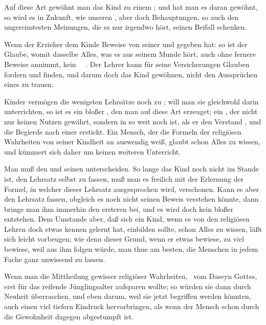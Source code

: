  Auf diese Art gewöhnt man das Kind zu einem ; und hat man es daran gewöhnt, so wird es in Zukunft, wie unseren , aber doch  Behauptungen, so auch den ungereimtesten Meinungen, die es nur irgendwo hört, seinen Beifall schenken.\par
{} Wenn der Erzieher dem Kinde Beweise von seiner  und  gegeben hat: so ist der Glaube, womit dasselbe Alles, was es aus seinem Munde hört, auch ohne fernere Beweise annimmt, kein ~\ . Der Lehrer kann für seine Versicherungen Glauben fordern und finden, und darum doch das Kind gewöhnen, nicht den Aussprüchen eines  zu trauen.\par
{} Kinder vermögen die wenigsten Lehrsätze noch zu ; will man sie gleichwohl darin unterrichten, so ist es ein bloßer , den man auf diese Art erzeuget; ein , der nicht nur keinen Nutzen gewährt, sondern in so weit noch  ist, als er den Verstand , und die Begierde nach einer  erstickt. Ein Mensch, der die Formeln der religiösen Wahrheiten von seiner Kindheit an auswendig weiß, glaubt schon Alles zu wissen, und kümmert sich daher um keinen weiteren Unterricht.\par
{} Man muß den  und seinen  unterscheiden. So lange das Kind noch nicht im Stande ist, den Lehrsatz selbst zu fassen, muß man es freilich mit der Erlernung der Formel, in welcher dieser Lehrsatz ausgesprochen wird, verschonen. Kann es aber den Lehrsatz fassen, obgleich es noch nicht seinen Beweis verstehen könnte, dann bringe man ihm immerhin den ersteren bei, und es wird doch kein bloßer  entstehen. Dem Umstande aber, daß sich ein Kind, wenn es von den religiösen Lehren doch etwas kennen gelernt hat, einbilden sollte, schon Alles zu wissen, läßt sich leicht vorbeugen; wie denn dieser Grund, wenn er etwas bewiese, zu viel bewiese, weil aus ihm folgen würde, man thue am besten, die Menschen in jedem Fache ganz unwissend zu lassen.\par
{} Wenn man die Mittheilung gewisser religiöser Wahrheiten, \zB\ vom Daseyn Gottes, erst für das reifende Jünglingsalter aufsparen wollte; so würden sie dann durch Neuheit überraschen, und eben darum, weil sie jetzt  begriffen werden könnten, auch einen viel tiefern Eindruck hervorbringen, als wenn der Mensch schon durch die Gewohnheit dagegen abgestumpft ist.\par
